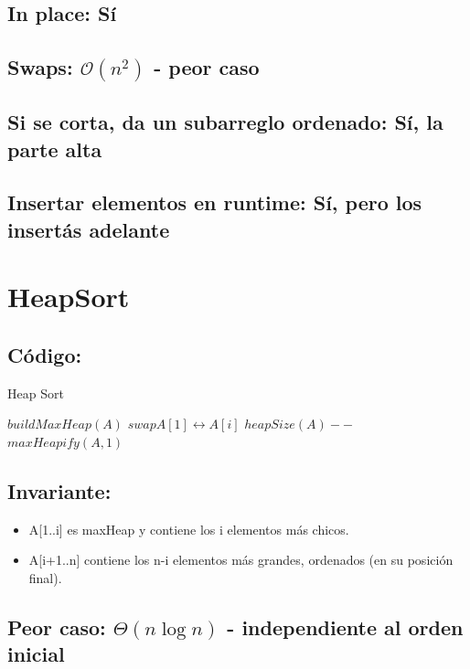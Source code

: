 \documentclass[a4paper]{article}
\begin{document}
\subsection{In place: S\'i}
\subsection{Swaps: $\mathcal{O}(n^{2})$ - peor caso}
\subsection{Si se corta, da un subarreglo ordenado: S\'i, la parte alta}
\subsection{Insertar elementos en runtime: S\'i, pero los insert\'as adelante}

\newpage
\section{HeapSort}

\subsection{C\'odigo:}
\begin{algorithm}
\caption{Heap Sort}\label{selection}
\begin{algorithmic}[1]
	\State $buildMaxHeap(A)$
		\State $swap A[1] \leftrightarrow A[i]$
		\State $heapSize(A)--$
		\State $maxHeapify(A,1)$
	\EndFor
\EndProcedure
\end{algorithmic}
\end{algorithm}

\subsection{Invariante:}
\begin{itemize}
	\item{A[1..i] es maxHeap y contiene los i elementos m\'as chicos.}
	\item{A[i+1..n] contiene los n-i elementos m\'as grandes, ordenados (en su posici\'on final).}
\end{itemize}

\subsection{Peor caso: $\Theta (n \log{} n)$ - independiente al orden inicial}
\end{document}
